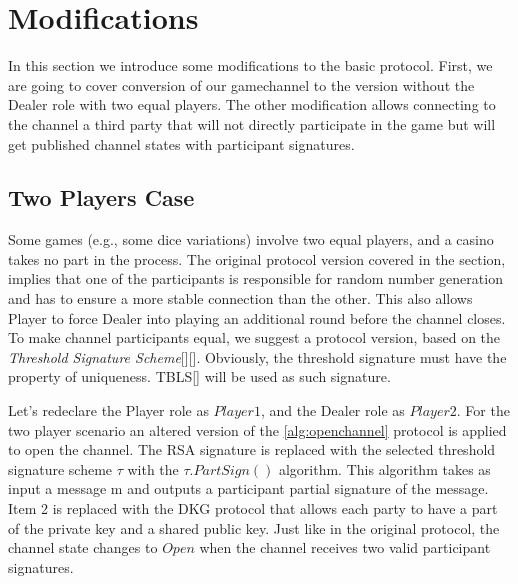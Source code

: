 \section{Modifications}
In this section we introduce some modifications to the basic protocol. First, we are going to cover conversion of our gamechannel to the version without the Dealer role with two equal players. The other modification allows connecting to the channel a third party that will not directly participate in the game but will get published channel states with participant signatures. 

\subsection{Two Players Case}
Some games (e.g., some dice variations) involve two equal players, and a casino takes no part in the process. The original protocol version covered in the  section, implies that one of the participants is responsible for random number generation and has to ensure a more stable connection than the other. This also allows Player to force Dealer into playing an additional round before the channel closes. To make channel participants equal, we suggest a protocol version, based on the  \textit {Threshold Signature Scheme}[][]. Obviously, the threshold signature must have the property of uniqueness. TBLS[] will be used as such signature.

Let’s redeclare the Player role as $Player1$, and the Dealer role as $Player2$. For the two player scenario an altered version of the \autoref{alg:openchannel} protocol is applied to open the channel. The RSA signature is replaced with the selected threshold signature scheme $ \tau $ with the $\tau.PartSign()$ algorithm. This algorithm takes as input a message m and outputs a  participant partial signature of the message. Item 2 is replaced with the DKG protocol that allows each party to have a part of the private key and a shared public key. Just like in the original protocol, the channel state changes to $Open$ when the channel receives two valid participant signatures. 

